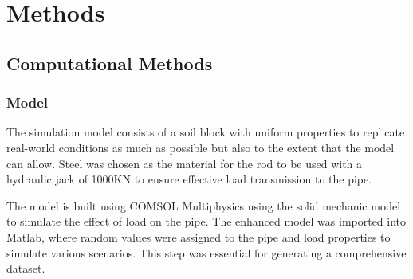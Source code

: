 \chapter{Methods}
\noindent
\section{Computational Methods}
\label{sec:compmeth}

\subsection{Model}
\label{sec:model}
The simulation model consists of a soil block with uniform properties to replicate real-world conditions as much as possible but also to the extent that the model can allow. Steel was chosen as the material for the rod to be used with a hydraulic jack of 1000KN to ensure effective load transmission to the pipe.

The model is built using COMSOL Multiphysics using the solid mechanic model to simulate the effect of load on the pipe. The enhanced model was imported into Matlab, where random values were assigned to the pipe and load properties to simulate various scenarios. This step was essential for generating a comprehensive dataset.


